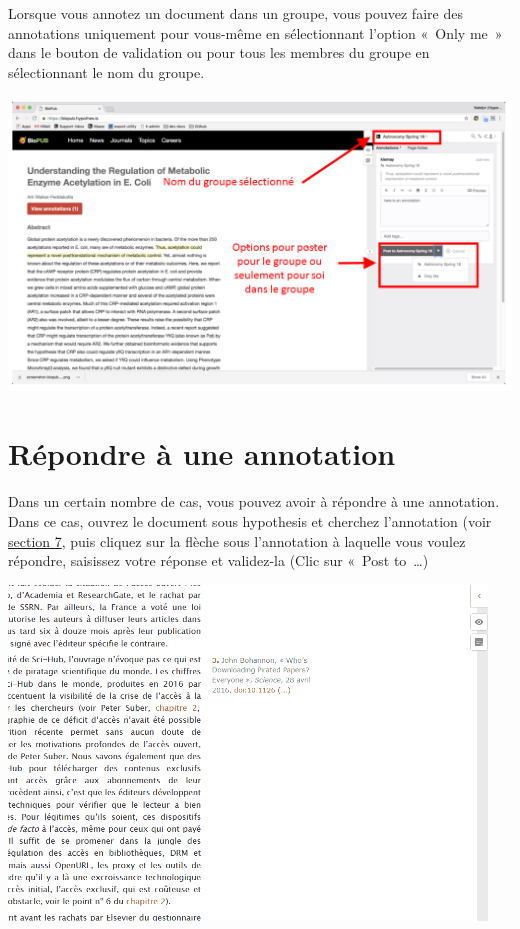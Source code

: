 \documentclass[
]{book}
\begin{document}
Lorsque vous annotez un document dans un groupe, vous pouvez faire des annotations uniquement pour vous-même en sélectionnant l'option «~Only me~» dans le bouton de validation ou pour tous les membres du groupe en sélectionnant le nom du groupe.

\includegraphics{img/postGroup.png}

\hypertarget{s65}{%
\section{Répondre à une annotation}\label{s65}}

Dans un certain nombre de cas, vous pouvez avoir à répondre à une annotation. Dans ce cas, ouvrez le document sous hypothesis et cherchez l'annotation (voir \protect\hyperlink{s7}{section 7}, puis cliquez sur la flèche sous l'annotation à laquelle vous voulez répondre, saisissez votre réponse et validez-la (Clic sur «~Post to~\ldots)

\includegraphics{img/30f5eff1df71626cf0748cd0af596424.png}
\end{document}
